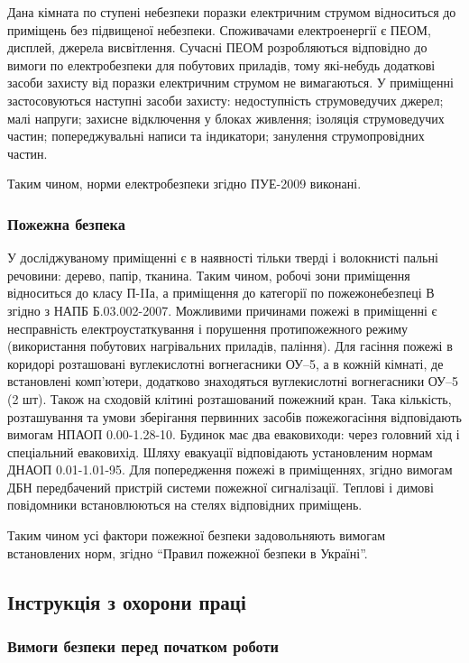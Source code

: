 Дана кімната по ступені небезпеки поразки електричним струмом відноситься до приміщень без підвищеної небезпеки. Споживачами електроенергії є ПЕОМ, дисплей, джерела висвітлення. Сучасні ПЕОМ розробляються відповідно до вимоги по електробезпеки для побутових приладів, тому які-небудь додаткові засоби захисту від поразки електричним струмом не вимагаються. У приміщенні застосовуються наступні засоби захисту: недоступність струмоведучих джерел;  малі напруги; захисне відключення у блоках живлення; ізоляція струмоведучих частин; попереджувальні написи та індикатори; занулення струмопровідних частин.

Таким чином, норми електробезпеки згідно ПУЕ-2009 виконані.

\subsubsection{Пожежна безпека}

У досліджуваному приміщенні є в наявності тільки тверді і волокнисті пальні речовини: дерево, папір, тканина. Таким чином, робочі зони приміщення відноситься до класу П-IIа, а приміщення до категорії  по пожежонебезпеці В згідно з НАПБ Б.03.002-2007. Можливими причинами пожежі в приміщенні є несправність електроустаткування і порушення протипожежного режиму (використання побутових нагрівальних приладів, паління). Для гасіння пожежі в коридорі розташовані вуглекислотні вогнегасники ОУ–5, а в кожній кімнаті, де встановлені комп'ютери, додатково знаходяться вуглекислотні вогнегасники ОУ–5 (2 шт). Також на сходовій клітині розташований пожежний кран. Така кількість, розташування та умови зберігання первинних засобів пожежогасіння відповідають вимогам НПАОП 0.00-1.28-10. Будинок має два еваковиходи: через головний хід і спеціальний еваковихід. Шляху евакуації відповідають установленим нормам ДНАОП 0.01-1.01-95. Для попередження пожежі в приміщеннях, згідно вимогам ДБН  передбачений пристрій системи пожежної сигналізації. Теплові і димові повідомники встановлюються на стелях відповідних приміщень.

 Таким чином усі фактори пожежної безпеки задовольняють вимогам встановлених норм, згідно ``Правил пожежної безпеки в Україні''.

\subsection{Інструкція з охорони праці}

\subsubsection{Вимоги безпеки перед початком роботи}

